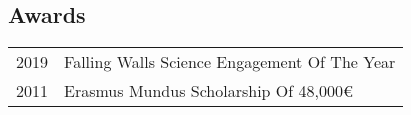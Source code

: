 \subsection{Awards}
\begin{tabular}
	{r|p{13cm}}
	\textsc{2019} & Falling Walls Science Engagement Of The Year\\
	\textsc{2011} & Erasmus Mundus Scholarship Of 48,000€\\
\end{tabular}
